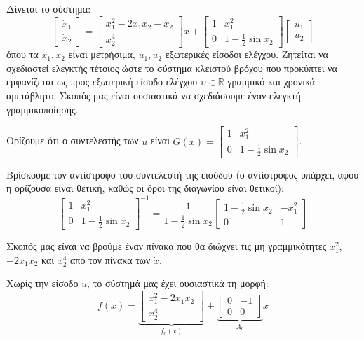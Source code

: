 \documentclass[11pt,a4paper,notitlepage,fleqn]{article}
\let\mytodo\todo
\renewcommand{\todo}[1]{\par\mytodo[inline,noline]{#1}}
\begin{document}
\begin{exercise}
	Δίνεται το σύστημα:
	\[
	\left[\begin{matrix}
	\dot x_1 \\ \dot x_2
	\end{matrix}\right] = \left[\begin{matrix}
	x_1^2 -2x_1x_2 -x_2 \\ x_2^4
	\end{matrix}\right]x + \left[\begin{matrix}
	1 & x_1^2 \\ 0 & 1-\frac{1}{2}\sin x_2
	\end{matrix}\right]\left[\begin{matrix}
	u_1 \\ u_2
	\end{matrix}\right]
	\]
	όπου τα \( x_1,x_2 \) είναι μετρήσιμα, \( u_1,u_2 \) εξωτερικές
	είσοδοι ελέγχου. Ζητείται να σχεδιαστεί ελεγκτής τέτοιος ώστε το
	σύστημα κλειστού βρόχου που προκύπτει να εμφανίζεται ως προς εξωτερική
	είσοδο ελέγχου \( \upsilon \in \mathbb R \) γραμμικό και χρονικά
	αμετάβλητο.
	\tcblower
	Σκοπός μας είναι ουσιαστικά να σχεδιάσουμε έναν ελεγκτή γραμμικοποίησης.
	
	\todo{Graph 31}
	
	Ορίζουμε ότι ο συντελεστής των \( u \) είναι
	\( G(x) = 	\left[\begin{matrix}
	1 & x_1^2 \\ 0 & 1-\frac{1}{2}\sin x_2
	\end{matrix}\right] \).
	
	Βρίσκουμε τον αντίστροφο του συντελεστή της εισόδου (ο αντίστροφος
	υπάρχει, αφού η ορίζουσα είναι θετική, καθώς οι όροι της διαγωνίου
	είναι θετικοί):
	\[
	\left[\begin{matrix}
	1 & x_1^2 \\ 0 & 1-\frac{1}{2}\sin x_2
	\end{matrix}\right]^{-1} =
	\frac{1}{1-\frac{1}{2}\sin x_2}\left[\begin{matrix}
	1-\frac{1}{2}\sin x_2 & -x_1^2 \\ 0 & 1
	\end{matrix}\right]
	\]
	
	Σκοπός μας είναι να βρούμε έναν πίνακα που θα διώχνει τις
	μη γραμμικότητες \( x_1^2 \), \( -2x_1x_2 \) και \( x_2^4 \) από
	τον πίνακα των \( \dot x \).
	
	Χωρίς την είσοδο \( u \), το σύστημά μας έχει ουσιαστικά τη μορφή:
	\[
	f(x) = \underbrace{\left[
	\begin{matrix}
	x_1^2 - 2x_1x_2 \\ x_2^4
	\end{matrix}
	\right]}_{f_0(x)}
    + \underbrace{\left[\begin{matrix}
    0 & -1 \\ 0 & 0
    \end{matrix}\right]}_{A_0}x
	\]
	

\end{exercise}
\end{document}
